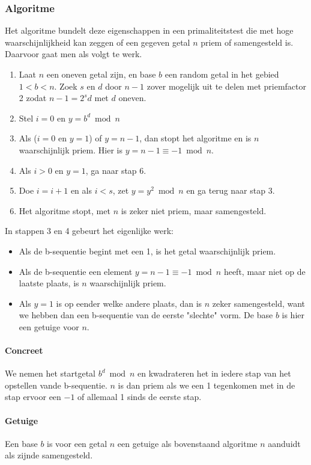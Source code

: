 \documentclass[11pt]{article}
\begin{document}
\subsubsection{Algoritme}
Het algoritme bundelt deze eigenschappen in een primaliteitstest die met hoge waarschijnlijkheid kan zeggen of een gegeven getal $n$ priem of samengesteld is. Daarvoor gaat men als volgt te werk.
\begin{enumerate}
  \item Laat $n$ een oneven getal zijn, en base $b$ een random getal in het gebied $1<b<n$. Zoek $s$ en $d$ door $n-1$ zover mogelijk uit te delen met priemfactor 2 zodat $n-1 = 2^sd$ met $d$ oneven.
  \item Stel $i = 0$ en $y=b^d \bmod{n}$
  \item Als ($i=0$ en $y=1$) of $y=n-1$, dan stopt het algoritme en is $n$ waarschijnlijk priem. Hier is $y=n-1 \equiv -1 \bmod{n}$.  
  \item Als $i>0$ en $y=1$, ga naar stap 6.
  \item Doe $i=i+1$ en als $i < s$, zet $y=y^2 \bmod{n}$ en ga terug naar stap 3.
  \item Het algoritme stopt, met $n$ is zeker niet priem, maar samengesteld.
\end{enumerate}
\pagebreak
In stappen 3 en 4 gebeurt het eigenlijke werk:
\begin{itemize}
	\item Als de b-sequentie begint met een 1, is het getal waarschijnlijk priem.
\item Als de b-sequentie een element $y=n-1 \equiv -1 \bmod {n}$ heeft, maar niet op de laatste plaats, is $n$ waarschijnlijk priem.
\item Als $y=1$ is op eender welke andere plaats, dan is $n$ zeker samengesteld, want we hebben dan een b-sequentie van de eerste "slechte" vorm. De base $b$ is hier een getuige voor $n$.
\end{itemize}

\paragraph{Concreet}
We nemen het startgetal $b^d \bmod{n}$ en kwadrateren het in iedere stap van het opstellen vande b-sequentie. $n$ is dan priem als we een 1 tegenkomen met in de stap ervoor een $-1$ of allemaal 1 sinds de eerste stap.

\paragraph{Getuige}
Een base $b$ is voor een getal $n$ een getuige als bovenstaand algoritme $n$ aanduidt als zijnde samengesteld.
\end{document}
